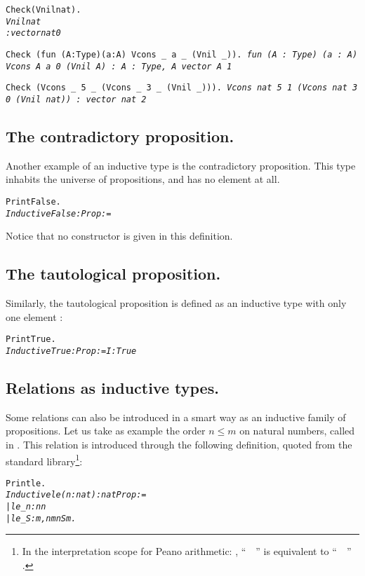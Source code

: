 \documentclass[11pt]{article}
\begin{document}
\begin{alltt}
Check (Vnil nat).
\it Vnil nat
     : vector nat 0

\tt Check (fun (A:Type)(a:A){\funarrow} Vcons _ a _ (Vnil _)).
\it fun (A : Type) (a : A) {\funarrow} Vcons A a 0 (Vnil A)
     : {\prodsym} A : Type, A {\arrow} vector A 1


\tt Check (Vcons _ 5 _ (Vcons _ 3 _ (Vnil _))).
\it Vcons nat 5 1 (Vcons nat 3 0 (Vnil nat))
     : vector nat 2
\end{alltt}

\subsection{The contradictory proposition.}
Another example of an inductive type is the contradictory proposition.
This type inhabits the universe of propositions, and has no element
at all.
\begin{alltt}
Print False.
\it{} Inductive False : Prop :=
\end{alltt}

\noindent Notice that no constructor is given in this definition.

\subsection{The tautological proposition.}
Similarly, the
tautological proposition {\True} is defined as an inductive type
with only one element {\I}:

\begin{alltt}
Print True.
\it{}Inductive True : Prop :=  I : True
\end{alltt}

\subsection{Relations as inductive types.}
Some relations can also be introduced in a smart way as an inductive family
of propositions. Let us take as example the order $n \leq m$ on natural
numbers, called  in {\coq}.
 This relation is introduced through
the following definition, quoted from the standard library\footnote{In the interpretation scope
for Peano arithmetic:
,  ``~~'' is equivalent to 
``~~'' .}:




\begin{alltt}
Print le. \it
Inductive le (n:nat) : nat\arrow{}Prop := 
|  le_n: n {\coqle} n 
|  le_S: {\prodsym} m, n {\coqle} m \arrow{} n {\coqle} S m.
\end{alltt}
\end{document}
